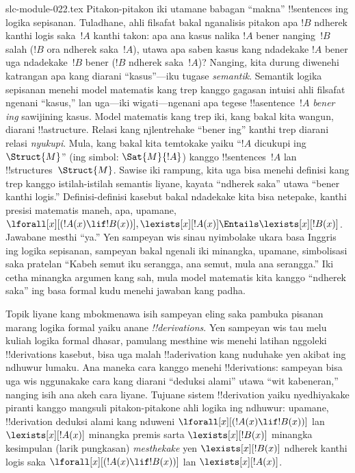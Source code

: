 \begin{filecontents*}[overwrite]{slc-module-022.tex}
Pitakon-pitakon iki utamane babagan ``makna'' !!{sentence}s ing logika
sepisanan. Tuladhane, ahli filsafat bakal nganalisis pitakon apa $!B$
ndherek kanthi logis saka~$!A$ kanthi takon: apa ana kasus nalika $!A$
bener nanging~$!B$ salah ($!B$ ora ndherek saka~$!A$), utawa apa saben
kasus kang ndadekake $!A$ bener uga ndadekake~$!B$ bener ($!B$ ndherek
saka~$!A$)? Nanging, kita durung diwenehi katrangan apa kang diarani
``kasus''---iku tugase \emph{semantik}. Semantik logika sepisanan
menehi model matematis kang trep kanggo gagasan intuisi ahli filsafat
ngenani ``kasus,'' lan uga---iki wigati---ngenani apa tegese
!!a{sentence}~$!A$ \emph{bener ing} sawijining kasus. Model matematis
kang trep iki, kang bakal kita wangun, diarani !!a{structure}. Relasi
kang njlentrehake ``bener ing'' kanthi trep diarani relasi
\emph{nyukupi}. Mula, kang bakal kita temtokake yaiku ``$!A$
dicukupi ing~$\Struct{M}$'' (ing simbol: $\Sat{M}{!A}$) kanggo
!!{sentence}s~$!A$ lan !!{structure}s~$\Struct{M}$. Sawise iki rampung,
kita uga bisa menehi definisi kang trep kanggo istilah-istilah semantis
liyane, kayata ``ndherek saka'' utawa ``bener kanthi logis.''
Definisi-definisi kasebut bakal ndadekake kita bisa netepake, kanthi
presisi matematis maneh, apa, upamane,
$\lforall[x][(!A(x) \lif !B(x))],
\lexists[x][!A(x)] \Entails \lexists[x][!B(x)]$.
Jawabane mesthi ``ya.'' Yen sampeyan wis sinau nyimbolake ukara basa
Inggris ing logika sepisanan, sampeyan bakal ngenali iki minangka,
upamane, simbolisasi saka pratelan ``Kabeh semut iku serangga, ana
semut, mula ana serangga.'' Iki cetha minangka argumen kang sah,
mula model matematis kita kanggo ``ndherek saka'' ing basa formal kudu
menehi jawaban kang padha.

Topik liyane kang mbokmenawa isih sampeyan eling saka pambuka pisanan
marang logika formal yaiku anane \emph{!!{derivation}s}. Yen sampeyan
wis tau melu kuliah logika formal dhasar, pamulang mesthine wis menehi
latihan nggoleki !!{derivation}s kasebut, bisa uga malah !!a{derivation}
kang nuduhake yen akibat ing ndhuwur lumaku. Ana maneka cara kanggo
menehi !!{derivation}s: sampeyan bisa uga wis nggunakake cara kang
diarani ``deduksi alami'' utawa ``wit kabeneran,'' nanging isih ana
akeh cara liyane. Tujuane sistem !!{derivation} yaiku nyedhiyakake
piranti kanggo mangsuli pitakon-pitakone ahli logika ing ndhuwur:
upamane, !!{derivation} deduksi alami kang nduweni
$\lforall[x][(!A(x) \lif !B(x))]$ lan $\lexists[x][!A(x)]$ minangka
premis sarta $\lexists[x][!B(x)]$ minangka kesimpulan (larik pungkasan)
\emph{mesthekake} yen $\lexists[x][!B(x)]$ ndherek kanthi logis saka
$\lforall[x][(!A(x) \lif !B(x))]$ lan $\lexists[x][!A(x)]$.


\end{filecontents*}
